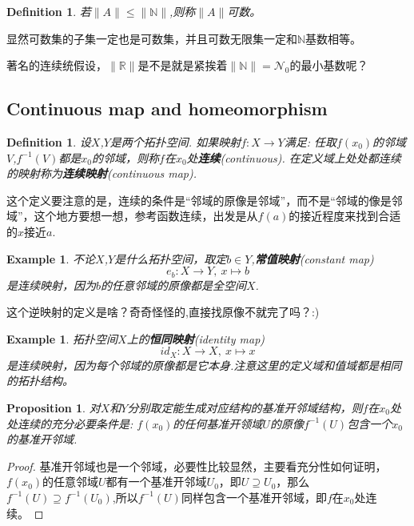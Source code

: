 \documentclass{article}
\newtheorem{proposition}[theorem]{Proposition}
\newtheorem{example}[theorem]{Example}
\newtheorem{definition}[theorem]{Definition}
\newcommand*{\xfunc}[4]{{#2}\colon{#3}{#1}{#4}}
\newcommand*{\func}[3]{\xfunc{\to}{#1}{#2}{#3}}
\begin{document}
\begin{definition}
若$\|A\| \leqslant \|\mathbb{N}\|$,则称$\|A\|$可数。 
\end{definition}

显然可数集的子集一定也是可数集，并且可数无限集一定和$\mathbb{N}$基数相等。

著名的连续统假设，$\|\mathbb{R}\|$是不是就是紧挨着$\|\mathbb{N}\|=\mathcal{N}_0$的最小基数呢？

\subsection{Continuous map and homeomorphism}

\begin{definition}
设$X$,$Y$是两个拓扑空间. 如果映射$\func{f}{X}{Y}$满足: 任取$f(x_0)$的邻域$V$,$f^{-1}(V)$都是$x_0$的邻域，则称$f$在$x_0$处\textbf{连续}(continuous). 在定义域上处处都连续的映射称为\textbf{连续映射}(continuous map).
\end{definition}

这个定义要注意的是，连续的条件是“邻域的原像是邻域”，而不是“邻域的像是邻域”，这个地方要想一想，参考函数连续，出发是从$f(a)$的接近程度来找到合适的$x$接近$a$.

\begin{example}
不论$X$,$Y$是什么拓扑空间，取定$b \in Y$,\textbf{常值映射}(constant map)\[\func{e_b}{X}{Y},\ x \mapsto b\]是连续映射，因为$b$的任意邻域的原像都是全空间$X$.
\end{example}

这个逆映射的定义是啥？奇奇怪怪的,直接找原像不就完了吗？:)

\begin{example}
拓扑空间$X$上的\textbf{恒同映射}(identity map)\[\func{id_{X}}{X}{X},\ x\mapsto x\]是连续映射，因为每个邻域的原像都是它本身.注意这里的定义域和值域都是相同的拓扑结构。
\end{example}

\begin{proposition}
对$X$和$Y$分别取定能生成对应结构的基准开邻域结构，则$f$在$x_0$处处连续的充分必要条件是: $f(x_0)$的任何基准开领域$U$的原像$f^{-1}(U)$包含一个$x_0$的基准开邻域.
\end{proposition}

\begin{proof}
基准开邻域也是一个邻域，必要性比较显然，主要看充分性如何证明，$f(x_0)$的任意邻域$U$都有一个基准开邻域$U_0$，即$U \supseteq U_0$，那么$f^{-1}(U) \supseteq f^{-1}(U_0)$,所以$f^{-1}(U)$同样包含一个基准开邻域，即$f$在$x_0$处连续。
\end{proof}
\end{document}
